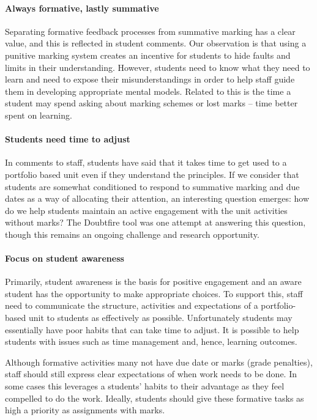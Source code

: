 \paragraph{Always formative, lastly summative}

Separating formative feedback processes from summative marking has a clear value, and this is reflected in student comments. Our observation is that using a punitive marking system creates an incentive for students to hide faults and limits in their understanding. However, students need to know what they need to learn and need to expose their misunderstandings in order to help staff guide them in developing appropriate mental models. Related to this is the time a student may spend asking about marking schemes or lost marks -- time better spent on learning.

\paragraph{Students need time to adjust}

In comments to staff, students have said that it takes time to get used to a portfolio based unit even if they understand the principles. If we consider that students are somewhat conditioned to respond to summative marking and due dates as a way of allocating their attention, an interesting question emerges: how do we help students maintain an active engagement with the unit activities without marks? The Doubtfire tool was one attempt at answering this question, though this remains an ongoing challenge and research opportunity.
 
\paragraph{Focus on student awareness}
 
Primarily, student awareness is the basis for positive engagement and an aware student has the opportunity to make appropriate choices. To support this, staff need to communicate the structure, activities and expectations of a portfolio-based unit to students as effectively as possible. Unfortunately students may essentially have poor habits that can take time to adjust. It is possible to help students with issues such as time management and, hence, learning outcomes.

Although formative activities many not have due date or marks (grade penalties), staff should still express clear expectations of when work needs to be done. In some cases this leverages a students' habits to their advantage as they feel compelled to do the work. Ideally, students should give these formative tasks as high a priority as assignments with marks.

